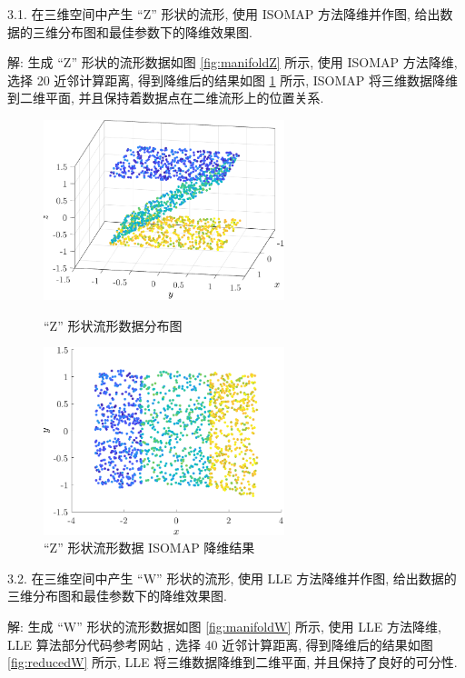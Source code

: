 \documentclass[openany]{ctexbook}
\theoremstyle{kaiti}
\theoremstyle{normal}
\begin{document}
3.1. 在三维空间中产生 ``Z'' 形状的流形, 使用 ISOMAP 方法降维并作图, 给出数据的三维分布图和最佳参数下的降维效果图.

解: 生成 ``Z'' 形状的流形数据如图 \ref{fig:manifoldZ} 所示, 使用 ISOMAP 方法降维, 选择 20 近邻计算距离, 得到降维后的结果如图 \ref{fig:reducedZ} 所示, ISOMAP 将三维数据降维到二维平面, 并且保持着数据点在二维流形上的位置关系.

\begin{figure}[htbp]
  \centering
  \begin{minipage}[t]{0.48\textwidth}
    \centering
    \includegraphics[width=7cm]{manifoldZ.pdf}
    \caption{``Z'' 形状流形数据分布图}
    \label{fig:manifoldZ}
  \end{minipage}
  \begin{minipage}[t]{0.48\textwidth}
    \centering
    \includegraphics[width=7cm]{reducedZ.pdf}
    \caption{``Z'' 形状流形数据 ISOMAP 降维结果}
    \label{fig:reducedZ}
  \end{minipage}
\end{figure}

3.2. 在三维空间中产生 ``W'' 形状的流形, 使用 LLE 方法降维并作图, 给出数据的三维分布图和最佳参数下的降维效果图.

解: 生成 ``W'' 形状的流形数据如图 \ref{fig:manifoldW} 所示, 使用 LLE 方法降维, LLE 算法部分代码参考网站 \cite{lle}, 选择 40 近邻计算距离, 得到降维后的结果如图 \ref{fig:reducedW} 所示, LLE 将三维数据降维到二维平面, 并且保持了良好的可分性.
\end{document}
